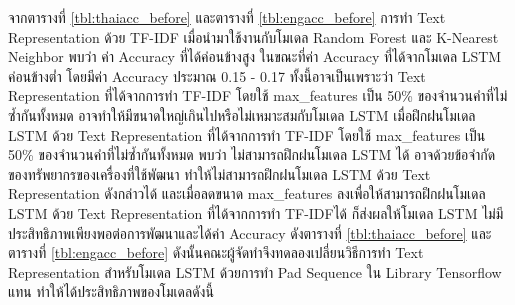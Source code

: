 \documentclass[12pt,oneside,openright,a4paper]{cpe-thai-project}
\begin{document}
      \hspace{1cm}จากตารางที่ \ref{tbl:thaiacc_before} และตารางที่ \ref{tbl:engacc_before} การทำ Text Representation ด้วย TF-IDF 
      เมื่อนำมาใช้งานกับโมเดล Random Forest และ K-Nearest Neighbor พบว่า ค่า Accuracy ที่ได้ค่อนข้างสูง ในขณะที่ค่า Accuracy ที่ได้จากโมเดล LSTM ค่อนข้างต่ำ
      โดยมีค่า Accuracy ประมาณ 0.15 - 0.17 ทั้งนี้อาจเป็นเพราะว่า Text Representation ที่ได้จากการทำ TF-IDF โดยใช้ max\_features เป็น 50\% ของจำนวนคำที่ไม่ซ้ำกันทั้งหมด
      อาจทำให้มีขนาดใหญ่เกินไปหรือไม่เหมาะสมกับโมเดล LSTM เมื่อฝึกฝนโมเดล LSTM ด้วย Text Representation ที่ได้จากการทำ TF-IDF โดยใช้ max\_features เป็น 50\% ของจำนวนคำที่ไม่ซ้ำกันทั้งหมด
      พบว่า ไม่สามารถฝึกฝนโมเดล LSTM ได้ อาจด้วยข้อจำกัดของทรัพยากรของเครื่องที่ใช้พัฒนา ทำให้ไม่สามารถฝึกฝนโมเดล LSTM ด้วย Text Representation ดังกล่าวได้
      และเมื่อลดขนาด max\_features ลงเพื่อให้สามารถฝึกฝนโมเดล LSTM ด้วย Text Representation ที่ได้จากการทำ TF-IDFได้ 
      ก็ส่งผลให้โมเดล LSTM ไม่มีประสิทธิภาพเพียงพอต่อการพัฒนาและได้ค่า Accuracy ดังตารางที่ \ref{tbl:thaiacc_before} และตารางที่ \ref{tbl:engacc_before}
      ดังนั้นคณะผู้จัดทำจึงทดลองเปลี่ยนวิธีการทำ Text Representation สำหรับโมเดล LSTM ด้วยการทำ Pad Sequence ใน Library Tensorflow แทน ทำให้ได้ประสิทธิภาพของโมเดลดังนี้
      \newpage
\end{document}
